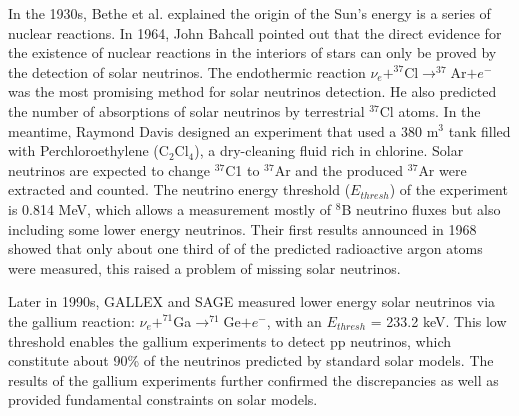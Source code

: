 \documentclass[preprint,12pt]{elsarticle}
\numberwithin{equation}{section}
\begin{document}
In the 1930s, Bethe et al. explained the origin of the Sun's energy is a series of nuclear reactions\cite{bethe2}. In 1964, John Bahcall pointed out that the direct evidence for the existence of nuclear reactions in the interiors of stars can only be proved by the detection of solar neutrinos. The endothermic reaction $\nu_e+^{37}$Cl$\to^{37}$Ar$+e^-$ was the most promising method for solar neutrinos detection. He also predicted the number of absorptions of solar neutrinos by terrestrial $^{37}$Cl atoms\cite{bahcall1}. In the meantime, Raymond Davis designed an experiment that used a 380 m$^3$ tank filled with Perchloroethylene (C$_2$Cl$_4$), a dry-cleaning fluid rich in chlorine. Solar neutrinos are expected to change $^{37}$C1 to $^{37}$Ar and the produced $^{37}$Ar were extracted and counted. The neutrino energy threshold ($E_{thresh}$) of the experiment is 0.814 MeV, which allows a measurement mostly of $^8$B neutrino fluxes but also including some lower energy neutrinos\cite{raymond}. Their first results announced in 1968 showed that only about one third of of the predicted radioactive argon atoms were measured, this raised a problem of missing solar neutrinos. 

Later in 1990s, GALLEX and SAGE measured lower energy solar neutrinos via the gallium reaction: $\nu_e+^{71}$Ga$\to^{71}$Ge$+e^-$, with an $E_{thresh}$ = 233.2 keV. This low threshold enables the gallium experiments to detect pp neutrinos, which constitute about 90\% of the neutrinos predicted by standard solar models. The results of the gallium experiments further confirmed the discrepancies as well as provided fundamental constraints on solar models\cite{GALLEX,SAGE,bahcall2}.
\end{document}
